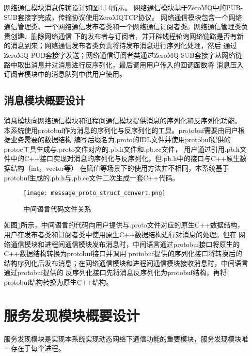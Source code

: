 网络通信模块消息传输设计如图4.14所示。
网络通信模块基于ZeroMQ中的PUB-SUB套接字完成，传输协议使用ZeroMQTCP协议。
网络通信模块包含一个网络通信管理类、一个网络通信发布者类和一个网络通信订阅者类。网络通信管理类负责创建、删除网络通信
下的发布者与订阅者，并开辟线程轮询网络链路是否有新的消息到来；网络通信发布者类负责将待发布消息进行序列化处理，然后
通过ZeroMQ PUB套接字发送；网络通信订阅者类通过ZeroMQ SUB套接字从网络链路中取出消息并对消息进行反序列化，最后调用用户传入的回调函数将
消息压入订阅者模块中的消息队列中供用户使用。

\subsection{消息模块概要设计}
消息模块向网络通信模块和进程间通信模块提供消息的序列化和反序列化功能。
本系统使用protobuf作为消息的序列化与反序列化的工具。protobuf需要由用户根据业务需要的数据结构
编写后缀名为.proto的IDL文件并使用protobuf提供的protoc工具生成与.proto文件对应的.pb.h文件和.pb.cc文件，
用户通过引用.pb.h文件中的C++接口实现对消息的序列化与反序列化，但.pb.h中的接口与C++原生数据结构（int，vector等）
在赋值等场景下的使用方法并不相同，本系统基于protobuf生成的.pb.h与.pb.cc文件二次生成一套C++代码。
\begin{figure}[H]
  \centering
  \texttt{[image: message\_proto\_struct\_convert.png]}
  \caption{中间语言代码文件关系}
  \label{proto-struct-convert}
\end{figure}

如图\ref{proto-struct-convert}所示，中间语言的代码向用户提供与.proto文件对应的原生C++数据结构，用户在发布者类和订阅者类中使用原生C++数据结构进行对消息的处理。但在
网络通信模块和进程间通信模块发布消息时，中间语言通过protobuf接口将原生的C++数据结构转换为protobuf接口并调用
protobuf提供的序列化接口将转换后的结构序列化后发布消息；在网络通信模块和进程间通信模块接收消息时，中间语言通过protobuf提供的
反序列化接口先将消息反序列化为protobuf结构，再将protobuf结构转换为原生C++结构。



\section{服务发现模块概要设计}
服务发现模块是实现本系统实现动态网络下通信功能的重要模块，服务发现模块唯一存在于每个进程。


